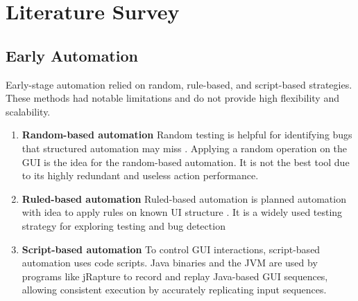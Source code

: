 \chapter{Literature Survey}

\section{Early Automation} 

Early-stage automation relied on random, rule-based, and script-based strategies. These methods had notable limitations and do not provide high flexibility and scalability.

\begin{enumerate}
    \item \textbf{Random-based automation} Random testing is helpful for identifying bugs that structured automation may miss \cite{RandomTesting:inproceedings}. Applying a random operation on the GUI is the idea for the random-based automation. It is not the best tool due to its highly redundant and useless action performance.
    \item \textbf{Ruled-based automation} Ruled-based automation is planned automation with idea to apply rules on known UI structure \cite{RuledBasedAutomation}. It is a widely used testing strategy for exploring testing and bug detection
    \item \textbf{Script-based automation} To control GUI interactions, script-based automation uses code scripts.  Java binaries and the JVM are used by programs like jRapture \cite{ScriptBasedAutomation} to record and replay Java-based GUI sequences, allowing consistent execution by accurately replicating input sequences.
\end{enumerate}



